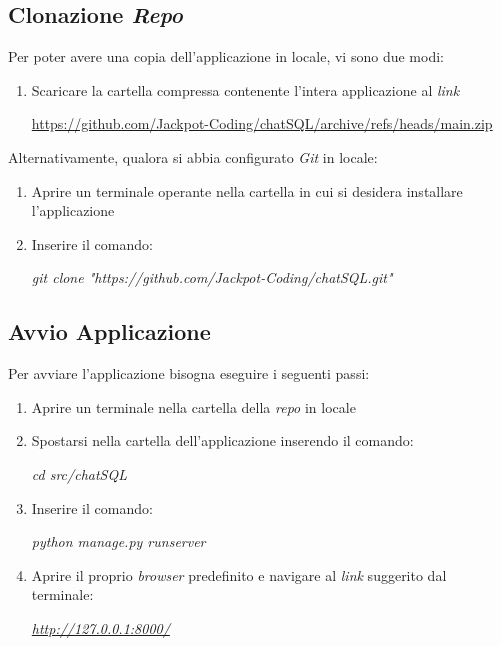 \documentclass[5pt]{article}
\begin{document}
			
		\newpage
        \subsection{Clonazione \textit{Repo}}
			Per poter avere una copia dell'applicazione in locale, vi sono due modi:
			\begin{enumerate}
				\item Scaricare la cartella compressa contenente l'intera applicazione al \textit{link}
					\begin{center}
						\url{https://github.com/Jackpot-Coding/chatSQL/archive/refs/heads/main.zip}
					\end{center}
			\end{enumerate}
			Alternativamente, qualora si abbia configurato \textit{Git} in locale:
			\begin{enumerate}
				\item Aprire un terminale operante nella cartella in cui si desidera installare l'applicazione
				\item Inserire il comando:
					\begin{center}
						\textit{git clone "https://github.com/Jackpot-Coding/chatSQL.git"}
					\end{center}
			\end{enumerate}

		\subsection{Avvio Applicazione}
			Per avviare l'applicazione bisogna eseguire i seguenti passi:
			\begin{enumerate}
				\item Aprire un terminale nella cartella della \textit{repo} in locale
				\item Spostarsi nella cartella dell'applicazione inserendo il comando:
					\begin{center}
						\textit{cd src/chatSQL}
					\end{center}
				\item Inserire il comando:
					\begin{center}
						\textit{python manage.py runserver}
					\end{center}
				\item Aprire il proprio \textit{browser} predefinito e navigare al \textit{link} suggerito dal terminale:
					\begin{center}
						\textit{\url{http://127.0.0.1:8000/}}
					\end{center}
			\end{enumerate}
 
\end{document}
